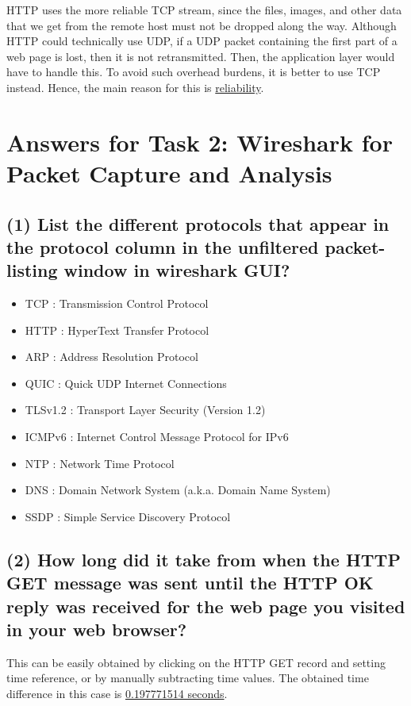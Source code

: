 \documentclass{article}
\begin{document}
HTTP uses the more reliable TCP stream, since the files, images, and other data that we get from the remote host must not be dropped along the way. Although HTTP could technically use UDP, if a UDP packet containing the first part of a web page is lost, then it is not retransmitted. Then, the application layer would have to handle this. To avoid such overhead burdens, it is better to use TCP instead. Hence, the main reason for this is \underline{reliability}.




\section{Answers for Task 2: Wireshark for Packet Capture and Analysis}

\subsection*{(1) List the different protocols that appear in the protocol column in the unfiltered packet-listing window in wireshark GUI?}
\begin{itemize}
    \item TCP : Transmission Control Protocol
    \item HTTP : HyperText Transfer Protocol
    \item ARP : Address Resolution Protocol
    \item QUIC : Quick UDP Internet Connections
    \item TLSv1.2 : Transport Layer Security (Version 1.2)
    \item ICMPv6 : Internet Control Message Protocol for IPv6
    \item NTP : Network Time Protocol
    \item DNS : Domain Network System (a.k.a. Domain Name System)
    \item SSDP : Simple Service Discovery Protocol
\end{itemize}

\subsection*{(2) How long did it take from when the HTTP GET message was sent until the HTTP OK reply was received for the web page you visited in your web browser? 
}
This can be easily obtained by clicking on the HTTP GET record and setting time reference, or by manually subtracting time values. The obtained time difference in this case is \underline{0.197771514 seconds}.
\end{document}
